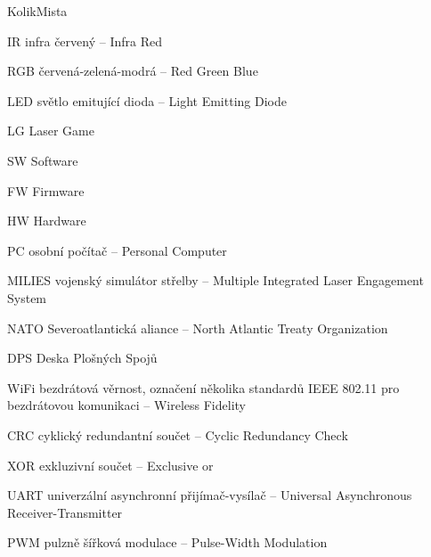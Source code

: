\begin{seznamzkratek}{KolikMista}

        {IR}
        {infra červený -- Infra Red}

        {RGB}
        {červená-zelená-modrá -- Red Green Blue}

        {LED}
        {světlo emitující dioda -- Light Emitting Diode}

        {LG}
        {Laser Game}

        {SW}
        {Software}

        {FW}
        {Firmware}

        {HW}
        {Hardware}

        {PC}
        {osobní počítač -- Personal Computer}

        {MILIES}
        {vojenský simulátor střelby -- Multiple Integrated Laser Engagement System}

        {NATO}
        {Severoatlantická aliance -- North Atlantic Treaty Organization}

        {DPS}
        {Deska Plošných Spojů}

        {WiFi}
        {bezdrátová věrnost, označení několika standardů IEEE 802.11 pro bezdrátovou komunikaci -- Wireless Fidelity}

        {CRC}
        {cyklický redundantní součet --  Cyclic Redundancy Check}

        {XOR}
        {exkluzivní součet --  Exclusive or}

        {UART}
        {univerzální asynchronní přijímač-vysílač --  Universal Asynchronous Receiver-Transmitter}

        {PWM}
        {pulzně šířková modulace --  Pulse-Width Modulation}

\end{seznamzkratek}
